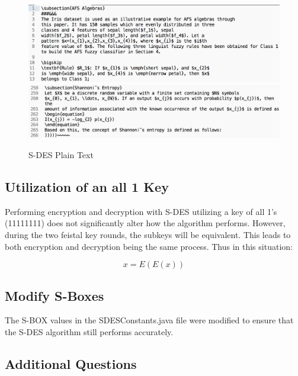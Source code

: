 \documentclass[]{article}
\begin{document}
\begin{figure}[H]
	\includegraphics[width=\textwidth]{sdes_plain1.png}
	\includegraphics[width=\textwidth]{sdes_plain2.png}	
	\caption{S-DES Plain Text}
	\centering
\end{figure}

\subsection*{Utilization of an all 1 Key}

Performing encryption and decryption with S-DES utilizing a key of all 1's (11111111) does not significantly alter how the algorithm performs. However, during the two feistal key rounds, the subkeys will be equivalent. This leads to both encryption and decryption being the same process. Thus in this situation:

$$x=E( E(x) )$$

\subsection*{Modify S-Boxes}


The S-BOX values in the SDESConstants.java file were modified to ensure that the S-DES algorithm still performs accurately.

\break

\vspace*{-0.8cm}
\begin{center}
	\section*{Additional Questions}
\end{center}
\end{document}
